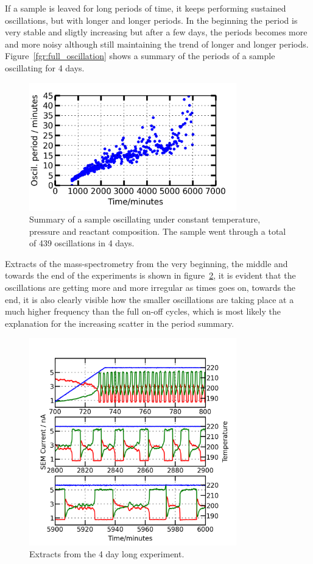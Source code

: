 \documentclass[8.5pt,twoside,twocolumn]{article}
\begin{document}
If a sample is leaved for long periods of time, it keeps performing sustained oscillations, but with longer and longer periods. In the beginning the period is very stable and sligtly increasing but after a few days, the periods becomes more and more noisy although still maintaining the trend of longer and longer periods. Figure~\ref{fgr:full_oscillation} shows a summary of the periods of a sample oscillating for 4 days. 
\begin{figure}[h]
\centering
  \includegraphics[width=9cm]{summary_of_long_measurement.png}
  \caption{Summary of a sample oscillating under constant temperature, pressure and reactant composition. The sample went through a total of 439 oscillations in 4 days.}
  \label{fgr:long_measurement}
\end{figure}

Extracts of the mass-spectrometry from the very beginning, the middle and towards the end of the experiments is shown in figure~\ref{fgr:extracts}, it is evident that the oscillations are getting more and more irregular as times goes on, towards the end, it is also clearly visible how the smaller oscillations are taking place at a much higher frequency than the full on-off cycles, which is most likely the explanation for the increasing scatter in the period summary.
\begin{figure}[h]
  \centering
  \includegraphics[width=9cm]{extracts_from_very_long_oscillation.png}
  \caption{Extracts from the 4 day long experiment.}
  \label{fgr:extracts}
\end{figure}
\end{document}
